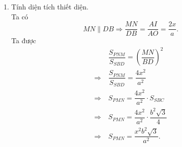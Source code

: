 \begin{bt}
{\begin{enumerate}
				Ta được $ \triangle PMN \sim \triangle SBD $.\\
				Vậy thiết diện là tam giác đều $ PMN $.
		\item Tính diện tích thiết diện.\\
		Ta có $$ MN \parallel DB \Rightarrow \dfrac{MN}{DB} = \dfrac{AI}{AO} = \dfrac{2x}{a}.  $$
		Ta được 
			\begin{align*}
				& \ \dfrac{S_{PNM}}{S_{SBD}} = \left ( \dfrac{MN}{BD} \right )^2 \\
				\Rightarrow 
				& \ \dfrac{S_{PNM}}{S_{SBD}} = \dfrac{4x^2}{a^2} \\
				\Rightarrow 
				& \ S_{PMN} = \dfrac{4x^2}{a^2} \cdot S_{SBC} \\
				\Rightarrow 
				& \ S_{PMN} = \dfrac{4x^2}{a^2} \cdot \dfrac{b^2 \sqrt{3} }{4} \\
				\Rightarrow 
				& \ S_{PMN} = \dfrac{x^2b^2 \sqrt{3}  }{a^2}.
			\end{align*}
	\end{enumerate}		
}	
\end{bt}
